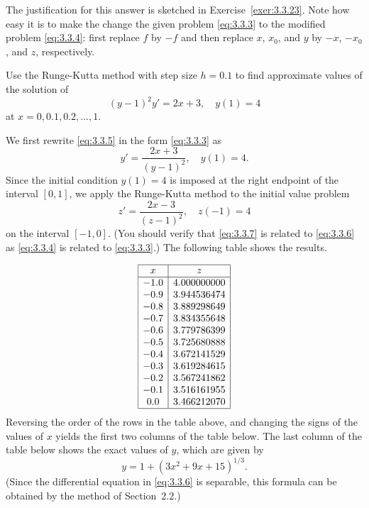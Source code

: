 \documentclass{ximera}
\begin{document}
The justification for this answer is sketched in
Exercise~\ref{exer:3.3.23}. Note how easy it is to make the change
the given problem \eqref{eq:3.3.3} to the modified problem
\eqref{eq:3.3.4}: first replace $f$ by $-f$ and then replace $x$,
$x_0$, and $y$ by $-x$, $-x_0$, and $z$, respectively.


\begin{example}\label{example:3.3.5}
Use the Runge-Kutta  method with step size $h=0.1$
 to find approximate values of the solution of
\begin{equation} \label{eq:3.3.5}
(y-1)^2y'=2x+3,\quad y(1)=4
\end{equation}
at $x=0, 0.1, 0.2, \dots, 1$.


\begin{explanation} 
We first rewrite \eqref{eq:3.3.5} in the form \eqref{eq:3.3.3}
as
\begin{equation} \label{eq:3.3.6}
y'=\frac{2x+3}{(y-1)^2},\quad y(1)=4.
\end{equation}
Since the initial condition $y(1)=4$  is imposed at the right endpoint
of the interval $[0,1]$, we apply the Runge-Kutta method to the
initial value problem
\begin{equation} \label{eq:3.3.7}
z'=\frac{2x-3}{(z-1)^2},\quad z(-1)=4
\end{equation}
on the interval $[-1,0]$.
(You should verify that \eqref{eq:3.3.7} is related to \eqref{eq:3.3.6} as
\eqref{eq:3.3.4} is related to \eqref{eq:3.3.3}.)
 The following table shows the results.  
 
$$
\begin{array}{|c|c|}
\hline
x&
z\\ \hline
-1.0 & 4.000000000  \\
-0.9 & 3.944536474  \\
-0.8 & 3.889298649  \\
-0.7 & 3.834355648  \\
-0.6 & 3.779786399  \\
-0.5 & 3.725680888  \\
-0.4 & 3.672141529  \\
-0.3 & 3.619284615  \\
-0.2 & 3.567241862  \\
-0.1 & 3.516161955  \\
 0.0 & 3.466212070 \\
\hline
\end{array}
$$
 Reversing the
order of the
rows in the table above, and changing the signs of the values of $x$
yields the first two columns of the table below.   The last
column of the table below shows the exact values of $y$, which
are given by
$$
y=1+(3x^2+9x+15)^{1/3}.
$$
(Since the differential equation in \eqref{eq:3.3.6} is separable,
this formula can be obtained by the method of Section~2.2.)



\end{explanation}
\end{example}
\end{document}
